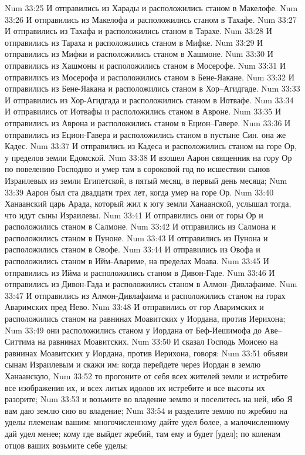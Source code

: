 Num 33:25  И отправились из Харады и расположились станом в Макелофе.
Num 33:26  И отправились из Макелофа и расположились станом в Тахафе.
Num 33:27  И отправились из Тахафа и расположились станом в Тарахе.
Num 33:28  И отправились из Тараха и расположились станом в Мифке.
Num 33:29  И отправились из Мифки и расположились станом в Хашмоне.
Num 33:30  И отправились из Хашмоны и расположились станом в Мосерофе.
Num 33:31  И отправились из Мосерофа и расположились станом в Бене-Яакане.
Num 33:32  И отправились из Бене-Яакана и расположились станом в Хор--Агидгаде.
Num 33:33  И отправились из Хор-Агидгада и расположились станом в Иотвафе.
Num 33:34  И отправились от Иотвафы и расположились станом в Авроне.
Num 33:35  И отправились из Аврона и расположились станом в Ецион--Гавере.
Num 33:36  И отправились из Ецион-Гавера и расположились станом в пустыне Син. она же Кадес.
Num 33:37  И отправились из Кадеса и расположились станом на горе Ор, у пределов земли Едомской.
Num 33:38  И взошел Аарон священник на гору Ор по повелению Господню и умер там в сороковой год по исшествии сынов Израилевых из земли Египетской, в пятый месяц, в первый день месяца;
Num 33:39  Аарон был ста двадцати трех лет, когда умер на горе Ор.
Num 33:40  Ханаанский царь Арада, который жил к югу земли Ханаанской, услышал тогда, что идут сыны Израилевы.
Num 33:41  И отправились они от горы Ор и расположились станом в Салмоне.
Num 33:42  И отправились из Салмона и расположились станом в Пуноне.
Num 33:43  И отправились из Пунона и расположились станом в Овофе.
Num 33:44  И отправились из Овофа и расположились станом в Ийм-Авариме, на пределах Моава.
Num 33:45  И отправились из Ийма и расположились станом в Дивон-Гаде.
Num 33:46  И отправились из Дивон-Гада и расположились станом в Алмон--Дивлафаиме.
Num 33:47  И отправились из Алмон-Дивлафаима и расположились станом на горах Аваримских пред Нево.
Num 33:48  И отправились от гор Аваримских и расположились станом на равнинах Моавитских у Иордана, против Иерихона;
Num 33:49  они расположились станом у Иордана от Беф-Иешимофа до Аве--Ситтима на равнинах Моавитских.
Num 33:50  И сказал Господь Моисею на равнинах Моавитских у Иордана, против Иерихона, говоря:
Num 33:51  объяви сынам Израилевым и скажи им: когда перейдете через Иордан в землю Ханаанскую,
Num 33:52  то прогоните от себя всех жителей земли и истребите все изображения их, и всех литых идолов их истребите и все высоты их разорите;
Num 33:53  и возьмите во владение землю и поселитесь на ней, ибо Я вам даю землю сию во владение;
Num 33:54  и разделите землю по жребию на уделы племенам вашим: многочисленному дайте удел более, а малочисленному дай удел менее; кому где выйдет жребий, там ему и будет [удел]; по коленам отцов ваших возьмите себе уделы;
